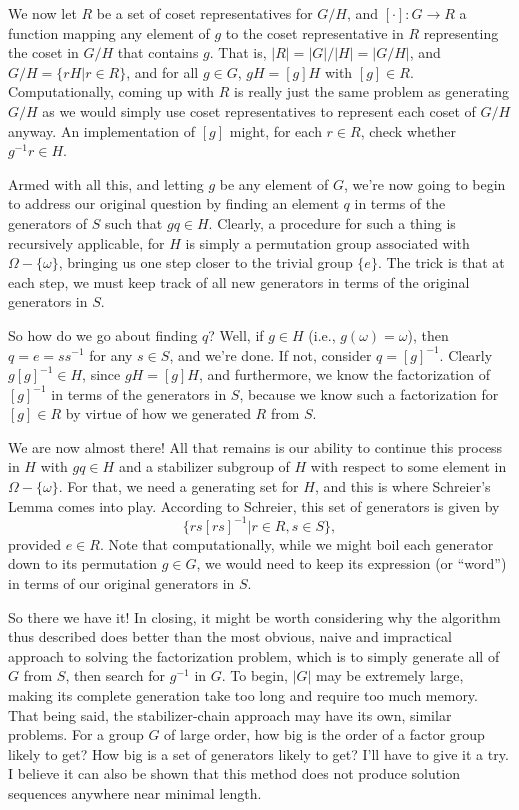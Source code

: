 \documentclass[12pt]{article}
\begin{document}
We now let $R$ be a set of coset representatives for $G/H$, and $[\cdot]:G\to R$ a function
mapping any element of $g$ to the coset representative in $R$ representing the coset in $G/H$ that contains $g$.
That is, $|R|=|G|/|H|=|G/H|$, and $G/H=\{rH|r\in R\}$, and for all $g\in G$, $gH=[g]H$ with $[g]\in R$.
Computationally, coming up with $R$ is really just the same problem as generating $G/H$ as we would simply use
coset representatives to represent each coset of $G/H$ anyway.  An implementation of $[g]$ might,
for each $r\in R$, check whether $g^{-1}r\in H$.

Armed with all this, and letting $g$ be any element of $G$, we're now going to begin to address our original
question by finding an element $q$ in terms of the generators of $S$ such that $gq\in H$.  Clearly, a procedure
for such a thing is recursively applicable, for $H$ is simply a permutation group associated with $\Omega-\{\omega\}$,
bringing us one step closer to the trivial group $\{e\}$.  The trick is that at each step, we must keep track of all new
generators in terms of the original generators in $S$.

So how do we go about finding $q$?  Well, if $g\in H$ (i.e., $g(\omega)=\omega$), then $q=e=ss^{-1}$ for any $s\in S$,
and we're done.  If not, consider $q=[g]^{-1}$.  Clearly $g[g]^{-1}\in H$, since $gH=[g]H$, and furthermore,
we know the factorization of $[g]^{-1}$ in terms of the generators in $S$, because we know such a factorization
for $[g]\in R$ by virtue of how we generated $R$ from $S$.

We are now almost there!  All that remains is our ability to continue this process in $H$ with $gq\in H$ and a stabilizer
subgroup of $H$ with respect to some element in $\Omega-\{\omega\}$.  For that, we need a generating set for $H$,
and this is where Schreier's Lemma comes into play.  According to Schreier, this set of generators is given by
\begin{equation*}
\{rs[rs]^{-1}|r\in R, s\in S\},
\end{equation*}
provided $e\in R$.
Note that computationally, while we might boil each generator down to its permutation $g\in G$, we would need
to keep its expression (or ``word'') in terms of our original generators in $S$.

So there we have it!  In closing, it might be worth considering why the algorithm thus described does
better than the most obvious, naive and impractical approach to solving the factorization problem, which is to
simply generate all of $G$ from $S$, then search for $g^{-1}$ in $G$.  To begin, $|G|$ may be
extremely large, making its complete generation take too long and require too much memory.
That being said, the stabilizer-chain approach may have its own, similar problems.  For a group $G$
of large order, how big is the order of a factor group likely to get?  How big is a set of generators
likely to get?  I'll have to give it a try.  I believe it can also be shown that this method does not
produce solution sequences anywhere near minimal length.
\end{document}
